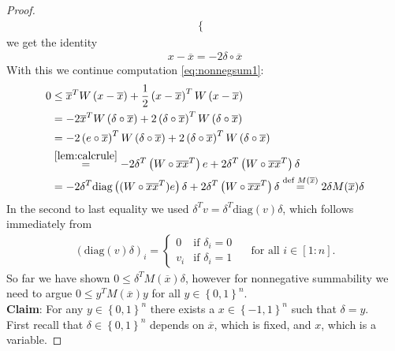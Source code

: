 \documentclass[12pt,a4paper]{article}
\theoremstyle{mythm}
\begin{document}
\begin{proof}
\begin{align*}
\begin{cases}
\end{cases}
\end{align*} 
we get the identity 
\begin{align*}
x - \overline{ x } = -2 \delta \circ \overline{ x } 
\end{align*} 
With this we continue computation \ref{eq:nonnegsum1}:
\begin{align*}
0 
&\leq \overline{ x } ^T W \left( x- \overline{ x }  \right) + \frac{ 1 }{ 2 } \left( x - \overline{ x }  \right) ^T W \left( x - \overline{ x }  \right) \\
&= -2 \overline{ x } ^T W \left( \delta \circ \overline{ x }  \right) + 2 \left( \delta \circ \overline{ x }  \right) ^T W \left( \delta \circ \overline{ x }  \right) \\
&= -2 \left( e \circ \overline{ x } \right)  ^T W \left( \delta \circ \overline{ x }  \right) + 2 \left( \delta \circ \overline{ x }  \right) ^T W \left( \delta \circ \overline{ x }  \right) \\
&\overset{ \ref{lem:calcrule}  }{ =}  -2 \delta ^T \left( W \circ \overline{ x } \overline{ x } ^T \right)  e + 2 \delta ^T \left( W \circ \overline{ x } \overline{ x } ^T  \right) \delta \\
&= -2 \delta ^T \text{diag} \left( ( W \circ \overline{ x } \overline{ x } ^T ) e  \right) \delta + 2 \delta ^T \left( W \circ \overline{ x } \overline{ x } ^T  \right) \delta 
\overset{ \text{def } M ( \overline{ x }  )   }{=}  2 \delta M ( \overline{ x }  ) \delta
\end{align*} 
In the second to last equality we used $ \delta ^T v = \delta ^T \text{diag} \left( v \right) \delta $, which follows immediately from
\begin{align*}
\left(  \text{diag} (v) \delta \right) _{ i } = 
\begin{cases}
0 & \text{if } \delta _{ i } = 0 \\
v_i & \text{if } \delta _{ i } = 1
\end{cases}
\quad \text{ for all } i \in \left[ 1:n \right].
\end{align*} 
So far we have shown $ 0 \leq \delta ^T M ( \overline{ x }  ) \delta  $, however for nonnegative summability we need to argue $ 0 \leq y ^T M ( \overline{ x }
) y  $ for all $ y \in \left\{ 0,1 \right\} ^{ n }  $.\\
\textbf{Claim}: For any $ y \in \left\{ 0,1 \right\} ^{ n } $ there exists a $ x \in \left\{ -1,1 \right\} ^{ n }  $ such that $ \delta = y $. \\
First recall that $ \delta \in \left\{ 0,1 \right\} ^{ n } $ depends on $ \overline{ x }  $, which is fixed, and $ x $, which is a variable. 

\end{proof}
\end{document}
